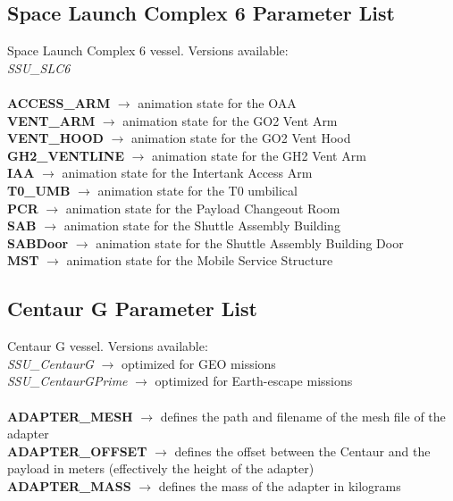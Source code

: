 \documentclass[Space_Shuttle_Ultra_Manual.tex]{subfiles}
\begin{document}
\begin{multicols*}{2}
\subsection{Space Launch Complex 6 Parameter List}
\noindent
Space Launch Complex 6 vessel. Versions available:
\\
\textit{SSU\_SLC6}
\\
\\
\textbf{ACCESS\_ARM} $\rightarrow$ animation state for the OAA
\\
\textbf{VENT\_ARM} $\rightarrow$ animation state for the GO2 Vent Arm
\\
\textbf{VENT\_HOOD} $\rightarrow$ animation state for the GO2 Vent Hood
\\
\textbf{GH2\_VENTLINE} $\rightarrow$ animation state for the GH2 Vent Arm
\\
\textbf{IAA} $\rightarrow$ animation state for the Intertank Access Arm
\\
\textbf{T0\_UMB} $\rightarrow$ animation state for the T0 umbilical
\\
\textbf{PCR} $\rightarrow$ animation state for the Payload Changeout Room
\\
\textbf{SAB} $\rightarrow$ animation state for the Shuttle Assembly Building
\\
\textbf{SABDoor} $\rightarrow$ animation state for the Shuttle Assembly Building Door
\\
\textbf{MST} $\rightarrow$ animation state for the Mobile Service Structure

\subsection{Centaur G Parameter List}
\noindent
Centaur G vessel. Versions available:
\\
\textit{SSU\_CentaurG} $\rightarrow$ optimized for GEO missions
\\
\textit{SSU\_CentaurGPrime} $\rightarrow$ optimized for Earth-escape missions
\\
\\
\textbf{ADAPTER\_MESH} $\rightarrow$ defines the path and filename of the mesh file of the adapter
\\
\textbf{ADAPTER\_OFFSET} $\rightarrow$ defines the offset between the Centaur and the payload in meters (effectively the height of the adapter)
\\
\textbf{ADAPTER\_MASS} $\rightarrow$ defines the mass of the adapter in kilograms


\end{multicols*}
\end{document}
